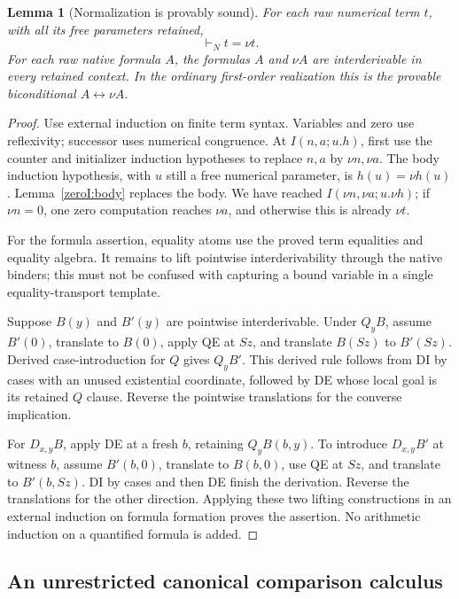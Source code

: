\documentclass[11pt,a4paper]{article}
\newtheorem{lemma}[theorem]{Lemma}
\theoremstyle{definition}
\begin{document}
\begin{lemma}[Normalization is provably sound]\label{zeroI:soundnorm}
For each raw numerical term $t$, with all its free parameters retained,
\[
 \vdash_N t=\nu t.
\]
For each raw native formula $A$, the formulas $A$ and $\nu A$ are
interderivable in every retained context.  In the ordinary first-order
realization this is the provable biconditional $A\leftrightarrow\nu A$.
\end{lemma}
\begin{proof}
Use external induction on finite term syntax.  Variables and zero use
reflexivity; successor uses numerical congruence.  At $I(n,a;u.h)$,
first use the counter and initializer induction hypotheses to replace
$n,a$ by $\nu n,\nu a$.  The body induction hypothesis, with $u$ still
a free numerical parameter, is $h(u)=\nu h(u)$.
Lemma~\ref{zeroI:body} replaces the body.  We have reached
$I(\nu n,\nu a;u.\nu h)$; if $\nu n=0$, one zero computation reaches
$\nu a$, and otherwise this is already $\nu t$.

For the formula assertion, equality atoms use the proved term equalities
and equality algebra.  It remains to lift pointwise interderivability
through the native binders; this must not be confused with capturing a
bound variable in a single equality-transport template.

Suppose $B(y)$ and $B'(y)$ are pointwise interderivable.  Under $Q_yB$,
assume $B'(0)$, translate to $B(0)$, apply QE at $Sz$, and translate
$B(Sz)$ to $B'(Sz)$.  Derived case-introduction for $Q$ gives $Q_yB'$.
This derived rule follows from DI by cases with an unused existential
coordinate, followed by DE whose local goal is its retained $Q$ clause.
Reverse the pointwise translations for the converse implication.

For $D_{x,y}B$, apply DE at a fresh $b$, retaining $Q_yB(b,y)$.  To
introduce $D_{x,y}B'$ at witness $b$, assume $B'(b,0)$, translate to
$B(b,0)$, use QE at $Sz$, and translate to $B'(b,Sz)$.  DI by cases and
then DE finish the derivation.  Reverse the translations for the other
direction.  Applying these two lifting constructions in an external
induction on formula formation proves the assertion.  No arithmetic
induction on a quantified formula is added.
\end{proof}

\subsection{An unrestricted canonical comparison calculus}
\end{document}
